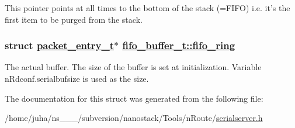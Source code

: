 This pointer points at all times to the bottom of the stack (=FIFO) i.e. it's the first item to be purged from the stack. \hypertarget{structfifo__buffer__t_572f410339929c934f4c89e2e1a90b76}{
\subsubsection[fifo\_\-ring]{\setlength{\rightskip}{0pt plus 5cm}struct \hyperlink{structpacket__entry__t}{packet\_\-entry\_\-t}$\ast$ \hyperlink{structfifo__buffer__t_572f410339929c934f4c89e2e1a90b76}{fifo\_\-buffer\_\-t::fifo\_\-ring}}}
\label{structfifo__buffer__t_572f410339929c934f4c89e2e1a90b76}


The actual buffer. The size of the buffer is set at initialization. Variable n\-Rdconf.serialbufsize is used as the size. 

The documentation for this struct was generated from the following file:\begin{CompactItemize}
\item 
/home/juha/ns\_\_\_/subversion/nanostack/Tools/n\-Route/\hyperlink{serialserver_8h}{serialserver.h}\end{CompactItemize}
